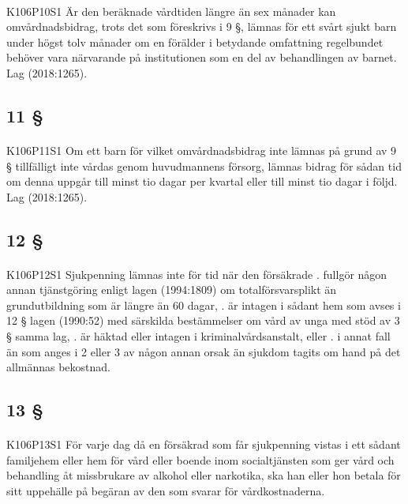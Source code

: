 \documentclass[a4paper,notitlepage,openany,10pt]{book}
\begin{document}
\paragraph*{}
{\tiny K106P10S1}
Är den beräknade vårdtiden längre än sex månader kan omvårdnadsbidrag, trots det som föreskrivs i 9 §, lämnas för ett svårt sjukt barn under högst tolv månader om en förälder i betydande omfattning regelbundet behöver vara närvarande på institutionen som en del av behandlingen av barnet.
Lag (2018:1265).
\subsection*{11 §}
\paragraph*{}
{\tiny K106P11S1}
Om ett barn för vilket omvårdnadsbidrag inte lämnas på grund av 9 § tillfälligt inte vårdas genom huvudmannens försorg, lämnas bidrag för sådan tid om denna uppgår till minst tio dagar per kvartal eller till minst tio dagar i följd.
Lag (2018:1265).
\subsection*{12 §}
\paragraph*{}
{\tiny K106P12S1}
Sjukpenning lämnas inte för tid när den försäkrade
. fullgör någon annan tjänstgöring enligt lagen (1994:1809) om totalförsvarsplikt än grundutbildning som är längre än 60 dagar,
. är intagen i sådant hem som avses i 12 § lagen (1990:52) med särskilda bestämmelser om vård av unga med stöd av 3 § samma lag,
. är häktad eller intagen i kriminalvårdsanstalt, eller
. i annat fall än som anges i 2 eller 3 av någon annan orsak än sjukdom tagits om hand på det allmännas bekostnad.
\subsection*{13 §}
\paragraph*{}
{\tiny K106P13S1}
För varje dag då en försäkrad som får sjukpenning vistas i ett sådant familjehem eller hem för vård eller boende inom socialtjänsten som ger vård och behandling åt missbrukare av alkohol eller narkotika, ska han eller hon betala för sitt uppehälle på begäran av den som svarar för vårdkostnaderna.
\end{document}
